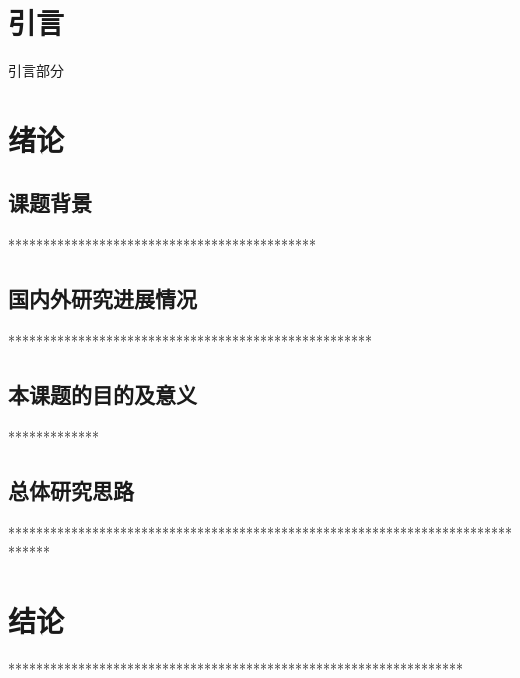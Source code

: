 \documentclass[12pt,a4paper]{article}
\begin{document}
{
\setlength{\baselineskip}{23pt}


\section*{引\quad 言}

引言部分


\newpage
\setcounter{section}{1}
\section{绪论}


\subsection{课题背景}
********************************************
\subsection{国内外研究进展情况}
****************************************************

\subsection{本课题的目的及意义}
*************

\subsection{总体研究思路}

******************************************************************************



\newpage
\section*{结论}
\setcounter{结论编号}{\value{section}} %
\addtocounter{结论编号}{1}

*****************************************************************


}
\end{document}
